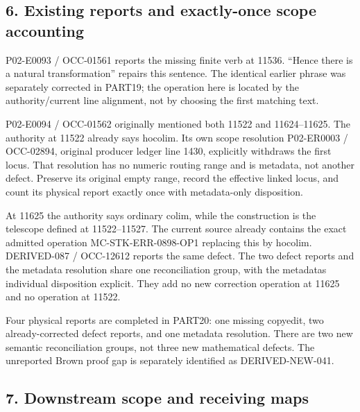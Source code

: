 \documentclass[11pt]{article}
\begin{document}
\subsection{6. Existing reports and exactly-once scope accounting}\label{proofs-11460-11655-existing-reports-and-exactly-once-scope-accounting}

P02-E0093 /\allowbreak{} OCC-01561 reports the missing finite verb at 11536. ``Hence there is a natural transformation'' repairs this sentence. The identical earlier phrase was separately corrected in PART19; the operation here is located by the authority/\allowbreak{}current line alignment,\allowbreak{} not by choosing the first matching text.

P02-E0094 /\allowbreak{} OCC-01562 originally mentioned both 11522 and 11624–\allowbreak{}11625. The authority at 11522 already says hocolim. Its own scope resolution P02-ER0003 /\allowbreak{} OCC-02894,\allowbreak{} original producer ledger line 1430,\allowbreak{} explicitly withdraws the first locus. That resolution has no numeric routing range and is metadata,\allowbreak{} not another defect. Preserve its original empty range,\allowbreak{} record the effective linked locus,\allowbreak{} and count its physical report exactly once with metadata-only disposition.

At 11625 the authority says ordinary colim,\allowbreak{} while the construction is the telescope defined at 11522–\allowbreak{}11527. The current source already contains the exact admitted operation MC-STK-ERR-0898-OP1 replacing this by hocolim. DERIVED-087 /\allowbreak{} OCC-12612 reports the same defect. The two defect reports and the metadata resolution share one reconciliation group,\allowbreak{} with the metadata\textquotesingle s individual disposition explicit. They add no new correction operation at 11625 and no operation at 11522.

Four physical reports are completed in PART20:\allowbreak{} one missing copyedit,\allowbreak{} two already-corrected defect reports,\allowbreak{} and one metadata resolution. There are two new semantic reconciliation groups,\allowbreak{} not three new mathematical defects. The unreported Brown proof gap is separately identified as DERIVED-NEW-041.

\subsection{7. Downstream scope and receiving maps}\label{proofs-11460-11655-downstream-scope-and-receiving-maps}
\end{document}
